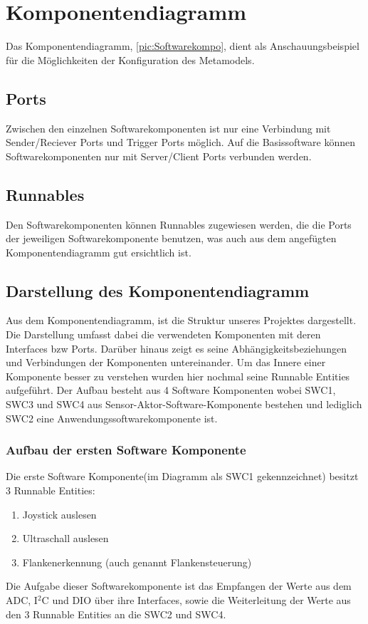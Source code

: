 \chapter{Komponentendiagramm}
Das Komponentendiagramm, \ref{pic:Softwarekompo}, dient als Anschauungsbeispiel für die Möglichkeiten der Konfiguration des Metamodels.
\section{Ports}
Zwischen den einzelnen Softwarekomponenten ist nur eine Verbindung mit Sender/Reciever Ports und Trigger Ports möglich. Auf die Basissoftware können Softwarekomponenten nur mit Server/Client Ports verbunden werden.
\section{Runnables}
Den Softwarekomponenten können Runnables zugewiesen werden, die die Ports der jeweiligen Softwarekomponente benutzen, was auch aus dem angefügten Komponentendiagramm gut ersichtlich ist.
\section{Darstellung des Komponentendiagramm}
Aus dem Komponentendiagramm, ist die Struktur unseres Projektes dargestellt. Die Darstellung umfasst dabei die verwendeten Komponenten mit deren Interfaces bzw Ports. Darüber hinaus zeigt es seine Abhängigkeitsbeziehungen und Verbindungen der Komponenten untereinander. Um das Innere einer Komponente besser zu verstehen wurden hier nochmal seine Runnable Entities aufgeführt. Der Aufbau besteht aus 4 Software Komponenten wobei SWC1, SWC3 und SWC4 aus Sensor-Aktor-Software-Komponente bestehen und lediglich SWC2 eine Anwendungssoftwarekomponente ist.

\subsection{Aufbau der ersten Software Komponente}
Die erste Software Komponente(im Diagramm als SWC1 gekennzeichnet) besitzt 3 Runnable Entities:
\begin{enumerate}
\item Joystick auslesen
\item Ultraschall auslesen
\item Flankenerkennung (auch genannt Flankensteuerung)
\end{enumerate}
Die Aufgabe dieser Softwarekomponente ist das Empfangen der Werte aus dem ADC, I$^2$C und DIO über ihre Interfaces, sowie die Weiterleitung der Werte aus den 3 Runnable Entities an die SWC2 und SWC4.


